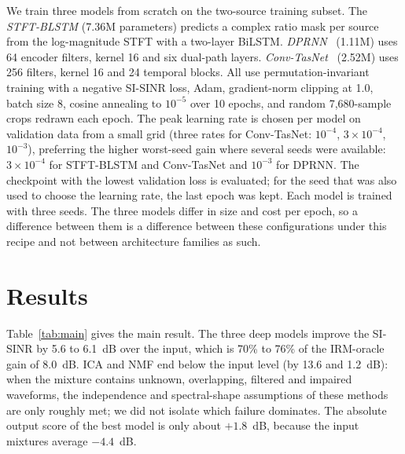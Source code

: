 \documentclass[conference]{IEEEtran}
\begin{document}
We train three models from scratch on the two-source training subset. The \emph{STFT-BLSTM} (7.36M parameters) predicts a complex ratio
mask per source from the log-magnitude STFT with a two-layer BiLSTM. \emph{DPRNN}~\cite{luo2020dual} (1.11M) uses
64 encoder filters, kernel 16 and six dual-path layers. \emph{Conv-TasNet}~\cite{luo2019conv} (2.52M) uses 256 filters,
kernel 16 and 24 temporal blocks. All use permutation-invariant training with a negative SI-SINR loss, Adam, gradient-norm clipping at 1.0,
batch size 8, cosine annealing to $10^{-5}$ over 10 epochs, and random 7,680-sample crops redrawn each epoch.
The peak learning rate is chosen per model on validation data from a small grid (three rates for Conv-TasNet: $10^{-4}$, $3\!\times\!10^{-4}$, $10^{-3}$), preferring the higher worst-seed gain where several seeds were available: $3\!\times\!10^{-4}$ for STFT-BLSTM and Conv-TasNet and $10^{-3}$ for DPRNN. The checkpoint with the lowest validation loss is evaluated;
for the seed that was also used to choose the learning rate, the last epoch was kept. Each model is trained with three seeds.
The three models differ in size and cost per epoch, so a difference between them is a difference between these configurations under this
recipe and not between architecture families as such.

\section{Results}
\label{sec:results}

\begin{table}[t]
\centering
\caption{Two-source test results: gain over the input mixture (dB, PI-SI-SINR), mean over three seeds (range of the three seeds), and for the
adjacent-channel and co-channel mixtures with SNR above 20~dB ($n\!=\!1{,}105$ and $756$). All test mixtures: $n\!=\!7{,}526$.}
\label{tab:main}
\resizebox{\columnwidth}{!}{%

}
\end{table}

Table~\ref{tab:main} gives the main result. The three deep models improve the SI-SINR by 5.6 to 6.1~dB over the input, which is 70\% to
76\% of the IRM-oracle gain of 8.0~dB. ICA and NMF end below the input level (by 13.6 and 1.2~dB): when the mixture contains
unknown, overlapping, filtered and impaired waveforms, the independence and spectral-shape assumptions of these methods are only roughly met; we did not isolate
which failure dominates. The absolute output score of the best model is only about
$+1.8$~dB, because the input mixtures average $-4.4$~dB.
\end{document}
